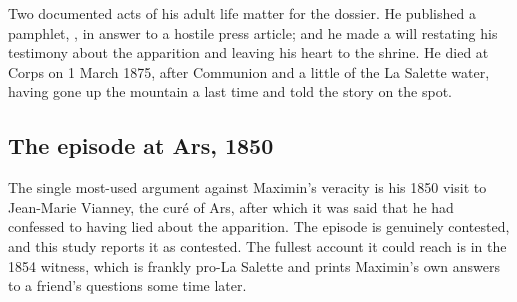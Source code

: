 Two documented acts of his adult life matter for the dossier. He
published a pamphlet, , in answer to a hostile press article; and
he made a will restating his testimony about the apparition and
leaving his heart to the shrine. He died at Corps on 1 March 1875,
after Communion and a little of the La Salette water, having gone up
the mountain a last time and told the story on the
spot.

\subsection{The episode at Ars, 1850}

The single most-used argument against Maximin's veracity is his 1850
visit to Jean-Marie Vianney, the curé of Ars, after which it was
said that he had confessed to having lied about the apparition. The
episode is genuinely contested, and this study reports it as
contested. The fullest account it could reach is in the 1854 witness,
which is frankly pro-La Salette and prints Maximin's own answers to
a friend's questions some time later.

